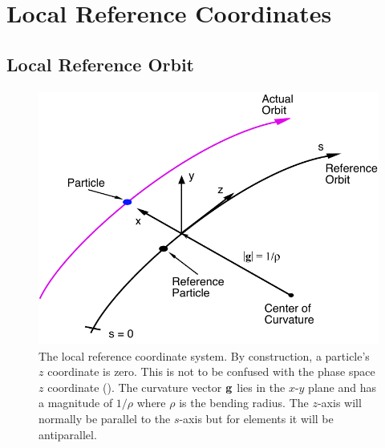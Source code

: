 \section{Local Reference Coordinates}
\label{s:local.coords}

\subsection{Local Reference Orbit}
\label{s:ref}

\begin{figure}[tb]
  \centering
  \includegraphics[height=8.4cm]{local-coords.pdf}
  \caption[The local Reference System.]
{The local reference coordinate system. By construction, a particle's $z$ coordinate is zero.  This
is not to be confused with the phase space $z$ coordinate (). The curvature
vector ${\bf g}$ lies in the $x$-$y$ plane and has a magnitude of $1/\rho$ where $\rho$ is the bending
radius. The $z$-axis will normally be parallel to the $s$-axis but for  elements it
will be antiparallel.  }
  \label{f:local.coords}
\end{figure}

